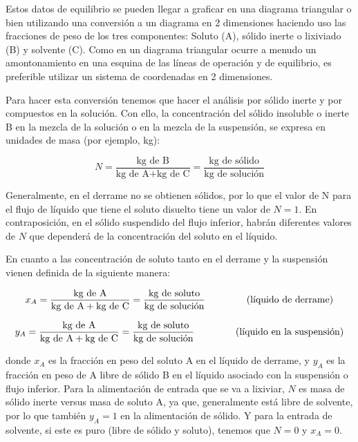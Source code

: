 \documentclass[11pt]{book}
\begin{document}
Estos datos de equilibrio se pueden llegar a graficar en una diagrama triangular o bien utilizando una conversión a un diagrama en 2 dimensiones haciendo uso las fracciones de peso de los tres componentes: Soluto (A), sólido inerte o lixiviado (B) y solvente (C). Como en un diagrama triangular ocurre a menudo un amontonamiento en una esquina de las líneas de operación y de equilibrio, es preferible utilizar un sistema de coordenadas en 2 dimensiones.

Para hacer esta conversión tenemos que hacer el análisis por sólido inerte y por compuestos en la solución. Con ello, la concentración del sólido insoluble o inerte B en la mezcla de la solución o en la mezcla de la suspensión, se expresa en unidades de masa (por ejemplo, kg):

\begin{equation}
    \label{eq:Lixiviacion_1}
    N = \frac{\textrm{kg de B}}{\textrm{kg de A} + \textrm{kg de C}} = \frac{\textrm{kg de sólido}}{\textrm{kg de solución}}
\end{equation}

Generalmente, en el derrame no se obtienen sólidos, por lo que el valor de N para el flujo de líquido que tiene el soluto disuelto tiene un valor de $N = 1$. En contraposición, en el sólido suspendido del flujo inferior, habrán diferentes valores de $N$ que dependerá de la concentración del soluto en el líquido. 

En cuanto a las concentración de soluto tanto en el derrame y la suspensión vienen definida de la siguiente manera:

\begin{equation}
    \label{eq:Lixiviacion_2}
    x_A = \frac{\textrm{kg de A}}{\textrm{kg de A} + \textrm{kg de C}} = \frac{\textrm{kg de soluto}}{\textrm{kg de solución}} \hspace{1.5cm} \textrm{(líquido de derrame)}
\end{equation}

\begin{equation}
    \label{eq:Lixiviacion_3}
    y_A = \frac{\textrm{kg de A}}{\textrm{kg de A} + \textrm{kg de C}} = \frac{\textrm{kg de soluto}}{\textrm{kg de solución}} \hspace{1.5cm} \textrm{(líquido en la suspensión)}
\end{equation}

donde $x_A$ es la fracción en peso del soluto A en el líquido de derrame, y $y_A$ es la fracción en peso de A libre de sólido B en el líquido asociado con la suspensión o flujo inferior. Para la alimentación de entrada que se va a lixiviar, $N$ es masa de sólido inerte versus masa de soluto A, ya que, generalmente está libre de solvente, por lo que también $y_A = 1$ en la alimentación de sólido. Y para la entrada de solvente, si este es puro (libre de sólido y soluto), tenemos que $N = 0$ y $x_A = 0$.
\end{document}
